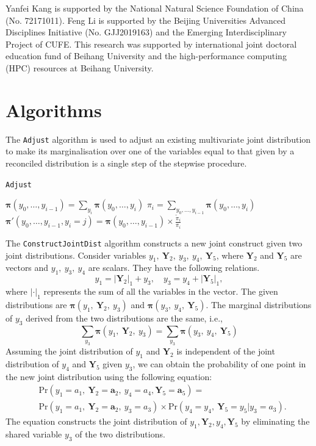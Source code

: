 \documentclass[a4paper,review,12pt,authoryear]{elsarticle}
\let\code=\texttt
\newcommand{\bY}{\mathbf{Y}}
\newcommand{\bpi}{\bm{\pi}}
\theoremstyle{definition}
\begin{document}
Yanfei Kang is supported by the National Natural Science Foundation of China (No. 72171011). Feng Li is supported by the Beijing Universities Advanced Disciplines Initiative (No. GJJ2019163) and the Emerging Interdisciplinary Project of CUFE. This research was supported by international joint doctoral
education fund of Beihang University and the high-performance computing (HPC) resources at Beihang University.


\begingroup
{}


\endgroup

\newpage

\appendix

\section{Algorithms}
\label{appendix:adjust}

The \code{Adjust} algorithm is used to adjust an existing multivariate joint distribution to make its marginalisation over one of the variables equal to that given by a reconciled distribution is a single step of the stepwise procedure.

\begin{algorithm}[H]
  \label{alg:adjust}
  \caption{\code{Adjust}}
  \Input{$\bpi(y_0,y_1,\dots,y_i), \tilde\pi_i, y_i \in \{0,1,\dots,k_i\}$}

  $\bpi(y_0,\dots,y_{i-1}) = \sum_{y_i}\bpi(y_0,\dots,y_i)$\;
  $\pi_i = \sum_{y_0,\dots,y_{i-1}}\bpi(y_0,\dots,y_i)$ \;
   {
    $\bpi'(y_0,\dots,y_{i-1}, y_i=j) = \bpi(y_0,\dots,y_{i-1}) \times \frac{\tilde\pi_i}{\pi_i}$ \;
  }

  \Output{$\bpi'(y_0,\dots,y_i)$}

 \end{algorithm}


 The \code{ConstructJointDist} algorithm constructs a new joint construct given two joint distributions.
 Consider variables $y_1, ~ \bY_2, ~ y_3, ~ y_4, ~ \bY_5$, where $\bY_2$ and $\bY_5$ are vectors and $y_1, ~ y_3, ~ y_4$ are scalars.
 They have the following relations.
 \[
  y_1 = |\bY_2|_1 + y_3, \quad y_3 = y_4 + |\bY_5|_1,
 \]
 where $|\cdot|_1$ represents the sum of all the variables in the vector.
 The given distributions are $\bpi(y_1, ~ \bY_2, ~ y_3)$ and $\bpi(y_3, ~ y_4, ~ \bY_5)$.
 The marginal distributions of $y_3$ derived from the two distributions are the same, i.e.,
 \[
  \sum_{y_3} \bpi(y_1, ~ \bY_2, ~ y_3) = \sum_{y_3}\bpi(y_3, ~ y_4, ~ \bY_5)
\]
 Assuming the joint distribution of $y_1$ and $\bY_2$ is independent of the joint distribution of $y_4$ and $\bY_5$ given $y_3$, we can obtain the probability of one point in the new joint distribution using the following equation: \[
   \begin{aligned}
  &\text{Pr}(y_1=a_1, ~ \bY_2=\mathbf{a}_2, ~ y_4=a_4, \bY_5 = \mathbf{a}_5) =\\ &\text{Pr} (y_1=a_1, ~ \bY_2=\mathbf{a}_2, ~ y_3=a_3) \times \text{Pr}(y_4=y_4, ~ \bY_5=y_5|y_3=a_3).
   \end{aligned}
 \]
 The equation constructs the joint distribution of $y_1, \bY_2, y_4, \bY_5$ by eliminating the shared variable $y_3$ of the two distributions.
\end{document}
